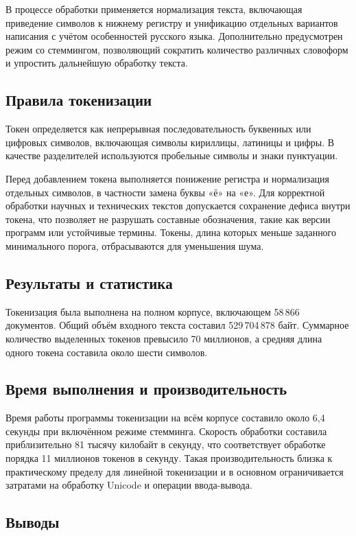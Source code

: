 \documentclass[12pt,a4paper]{article}
\begin{document}
В процессе обработки применяется нормализация текста, включающая приведение символов к нижнему регистру и унификацию отдельных вариантов написания с учётом особенностей русского языка. Дополнительно предусмотрен режим со стеммингом, позволяющий сократить количество различных словоформ и упростить дальнейшую обработку текста.

\subsection*{Правила токенизации}

Токен определяется как непрерывная последовательность буквенных или цифровых символов, включающая символы кириллицы, латиницы и цифры. В качестве разделителей используются пробельные символы и знаки пунктуации.

Перед добавлением токена выполняется понижение регистра и нормализация отдельных символов, в частности замена буквы «ё» на «е». Для корректной обработки научных и технических текстов допускается сохранение дефиса внутри токена, что позволяет не разрушать составные обозначения, такие как версии программ или устойчивые термины. Токены, длина которых меньше заданного минимального порога, отбрасываются для уменьшения шума.

\subsection*{Результаты и статистика}

Токенизация была выполнена на полном корпусе, включающем 58\,866 документов. Общий объём входного текста составил 529\,704\,878 байт. Суммарное количество выделенных токенов превысило 70 миллионов, а средняя длина одного токена составила около шести символов.

\subsection*{Время выполнения и производительность}

Время работы программы токенизации на всём корпусе составило около 6{,}4 секунды при включённом режиме стемминга. Скорость обработки составила приблизительно 81 тысячу килобайт в секунду, что соответствует обработке порядка 11 миллионов токенов в секунду. Такая производительность близка к практическому пределу для линейной токенизации и в основном ограничивается затратами на обработку Unicode и операции ввода-вывода.

\subsection*{Выводы}
\end{document}

